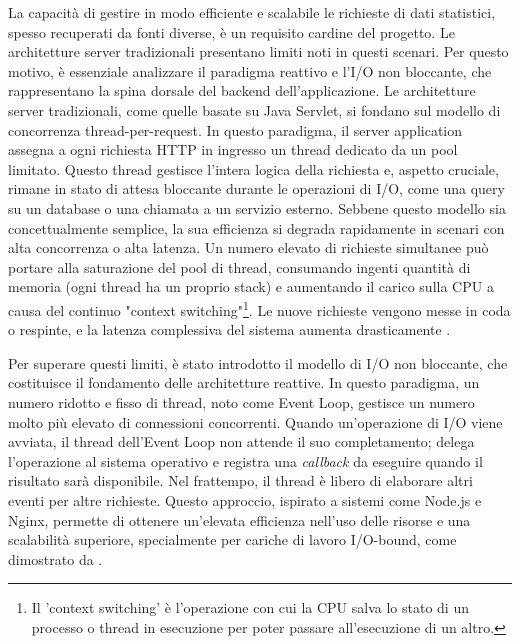 \documentclass[12pt,a4paper,openright,twoside]{book}
\begin{document}
La capacità di gestire in modo efficiente e scalabile le richieste di dati statistici, spesso recuperati da fonti diverse, è un requisito cardine del progetto. Le architetture server tradizionali presentano limiti noti in questi scenari. Per questo motivo, è essenziale analizzare il paradigma reattivo e l'I/O non bloccante, che rappresentano la spina dorsale del backend dell'applicazione.
Le architetture server tradizionali, come quelle basate su Java Servlet, si fondano sul modello di concorrenza thread-per-request. In questo paradigma, il server application assegna a ogni richiesta HTTP in ingresso un thread dedicato da un pool limitato. Questo thread gestisce l'intera logica della richiesta e, aspetto cruciale, rimane in stato di attesa bloccante durante le operazioni di I/O, come una query su un database o una chiamata a un servizio esterno. Sebbene questo modello sia concettualmente semplice, la sua efficienza si degrada rapidamente in scenari con alta concorrenza o alta latenza. Un numero elevato di richieste simultanee può portare alla saturazione del pool di thread, consumando ingenti quantità di memoria (ogni thread ha un proprio stack) e aumentando il carico sulla CPU a causa del continuo "context switching"\footnote{Il 'context switching' è l'operazione con cui la CPU salva lo stato di un processo o thread in esecuzione per poter passare all'esecuzione di un altro.}. Le nuove richieste vengono messe in coda o respinte, e la latenza complessiva del sistema aumenta drasticamente \cite{vrincean2021optimizing}.

Per superare questi limiti, è stato introdotto il modello di I/O non bloccante, che costituisce il fondamento delle architetture reattive. In questo paradigma, un numero ridotto e fisso di thread, noto come Event Loop, gestisce un numero molto più elevato di connessioni concorrenti. Quando un'operazione di I/O viene avviata, il thread dell'Event Loop non attende il suo completamento; delega l'operazione al sistema operativo e registra una \textit{callback} da eseguire quando il risultato sarà disponibile. Nel frattempo, il thread è libero di elaborare altri eventi per altre richieste. Questo approccio, ispirato a sistemi come Node.js e Nginx, permette di ottenere un'elevata efficienza nell'uso delle risorse e una scalabilità superiore, specialmente per cariche di lavoro I/O-bound, come dimostrato da \cite{derezinska2020performance}.
\end{document}
